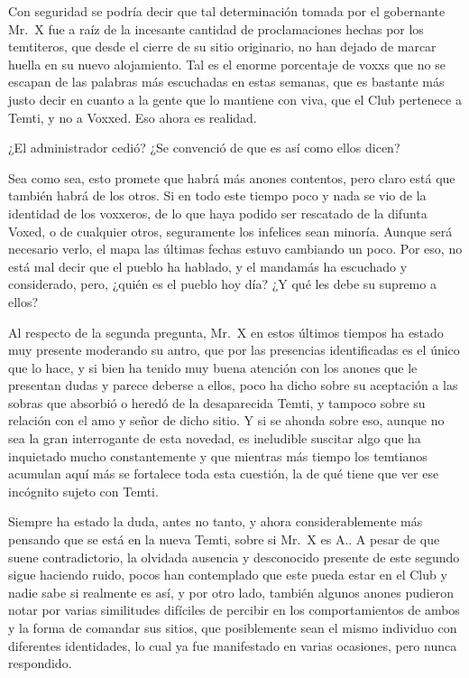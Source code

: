 \documentclass[
]{book}
\begin{document}
Con seguridad se podría decir que tal determinación tomada por el gobernante Mr.~X fue a raíz de la incesante cantidad de proclamaciones hechas por los temtiteros, que desde el cierre de su sitio originario, no han dejado de marcar huella en su nuevo alojamiento. Tal es el enorme porcentaje de voxxs que no se escapan de las palabras más escuchadas en estas semanas, que es bastante más justo decir en cuanto a la gente que lo mantiene con viva, que el Club pertenece a Temti, y no a Voxxed. Eso ahora es realidad.

¿El administrador cedió? ¿Se convenció de que es así como ellos dicen?

Sea como sea, esto promete que habrá más anones contentos, pero claro está que también habrá de los otros. Si en todo este tiempo poco y nada se vio de la identidad de los voxxeros, de lo que haya podido ser rescatado de la difunta Voxed, o de cualquier otros, seguramente los infelices sean minoría. Aunque será necesario verlo, el mapa las últimas fechas estuvo cambiando un poco. Por eso, no está mal decir que el pueblo ha hablado, y el mandamás ha escuchado y considerado, pero, ¿quién es el pueblo hoy día? ¿Y qué les debe su supremo a ellos?

Al respecto de la segunda pregunta, Mr.~X en estos últimos tiempos ha estado muy presente moderando su antro, que por las presencias identificadas es el único que lo hace, y si bien ha tenido muy buena atención con los anones que le presentan dudas y parece deberse a ellos, poco ha dicho sobre su aceptación a las sobras que absorbió o heredó de la desaparecida Temti, y tampoco sobre su relación con el amo y señor de dicho sitio. Y si se ahonda sobre eso, aunque no sea la gran interrogante de esta novedad, es ineludible suscitar algo que ha inquietado mucho constantemente y que mientras más tiempo los temtianos acumulan aquí más se fortalece toda esta cuestión, la de qué tiene que ver ese incógnito sujeto con Temti.

Siempre ha estado la duda, antes no tanto, y ahora considerablemente más pensando que se está en la nueva Temti, sobre si Mr.~X es A.. A pesar de que suene contradictorio, la olvidada ausencia y desconocido presente de este segundo sigue haciendo ruido, pocos han contemplado que este pueda estar en el Club y nadie sabe si realmente es así, y por otro lado, también algunos anones pudieron notar por varias similitudes difíciles de percibir en los comportamientos de ambos y la forma de comandar sus sitios, que posiblemente sean el mismo individuo con diferentes identidades, lo cual ya fue manifestado en varias ocasiones, pero nunca respondido.
\end{document}
